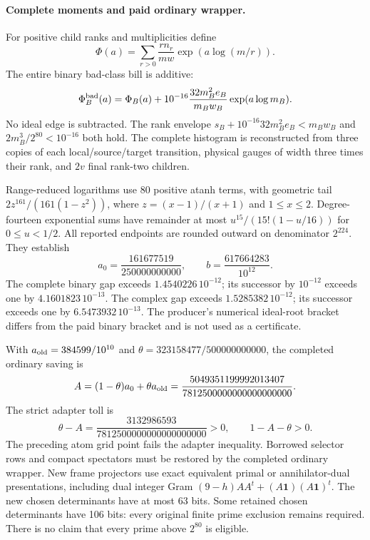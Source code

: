 \documentclass[11pt]{article}
\begin{document}
\paragraph{Complete moments and paid ordinary wrapper.}
For positive child ranks and multiplicities define
\[
 \Phi(a)=\sum_{r>0}\frac{rn_r}{mw}\exp(a\log(m/r)).
\]
The entire binary bad-class bill is additive:
\[
 \Phi_B^{\rm bad}(a)=\Phi_B(a)+10^{-16}
       \frac{32m_B^2e_B}{m_Bw_B}\exp(a\log m_B).
\]
No ideal edge is subtracted. The rank envelope
$s_B+10^{-16}32m_B^2e_B<m_Bw_B$ and
$2m_B^3/2^{80}<10^{-16}$ both hold.
The complete histogram is reconstructed from three copies of each
local/source/target transition, physical gauges of width three times their
rank, and $2v$ final rank-two children.

Range-reduced logarithms use 80 positive atanh terms, with geometric tail
$2z^{161}/(161(1-z^2))$, where $z=(x-1)/(x+1)$ and $1\le x\le2$.
Degree-fourteen exponential sums have remainder at most
$u^{15}/(15!(1-u/16))$ for $0\le u<1/2$.
All reported endpoints are rounded outward on denominator $2^{224}$.
They establish
\[
 a_0=\frac{161677519}{250000000000},\qquad
 b=\frac{617664283}{10^{12}}.
\]
The complete binary gap exceeds $1.4540226\,10^{-12}$; its successor
by $10^{-12}$ exceeds one by $4.1601823\,10^{-13}$.
The complex gap exceeds $1.5285382\,10^{-12}$; its successor exceeds
one by $6.5473932\,10^{-13}$.
The producer's numerical ideal-root bracket differs from the paid binary
bracket and is not used as a certificate.

With $a_{\rm old}=384599/10^{10}$ and
$\theta=323158477/500000000000$, the completed ordinary saving is
\[
 A=(1-\theta)a_0+\theta a_{\rm old}
 =\frac{5049351199992013407}{7812500000000000000000}.
\]
The strict adapter toll is
\[
 \theta-A=\frac{3132986593}{7812500000000000000000}>0,
 \qquad 1-A-\theta>0.
\]
The preceding atom grid point fails the adapter inequality. Borrowed selector
rows and compact spectators must be restored by the completed ordinary
wrapper. New frame projectors use exact equivalent primal or
annihilator-dual presentations, including dual integer Gram
$(9-h)AA^t+(A\mathbf1)(A\mathbf1)^t$. The new chosen determinants have
at most 63 bits. Some retained chosen determinants have 106 bits:
every original finite prime exclusion remains required. There is no
claim that every prime above $2^{80}$ is eligible.
\end{document}
